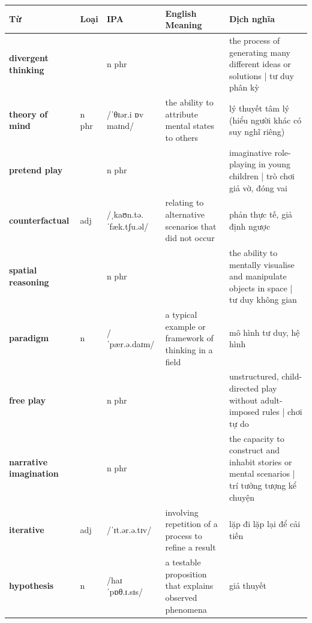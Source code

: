 \vspace{0.8em}
\begin{center}
\renewcommand{\arraystretch}{1.65}
\begin{tabularx}{\textwidth}{|V{0.22\textwidth}|C{0.07\textwidth}|I{0.20\textwidth}|Y|V{0.18\textwidth}|}
\hline
{}
\textbf{Từ} & \textbf{Loại} & \textbf{IPA} & \textbf{English Meaning} & \textbf{Dịch nghĩa} \\
\hline
\textbf{divergent thinking} & & n phr & & the process of generating many different ideas or solutions | tư duy phân kỳ \\ \hline
\textbf{theory of mind} & n phr & /ˈθɪər.i ɒv maɪnd/ & the ability to attribute mental states to others & lý thuyết tâm lý (hiểu người khác có suy nghĩ riêng) \\ \hline
\textbf{pretend play} & & n phr & & imaginative role-playing in young children | trò chơi giả vờ, đóng vai \\ \hline
\textbf{counterfactual} & adj & /ˌkaʊn.tə.ˈfæk.tʃu.əl/ & relating to alternative scenarios that did not occur & phản thực tế, giả định ngược \\ \hline
\textbf{spatial reasoning} & & n phr & & the ability to mentally visualise and manipulate objects in space | tư duy không gian \\ \hline
\textbf{paradigm} & n & /ˈpær.ə.daɪm/ & a typical example or framework of thinking in a field & mô hình tư duy, hệ hình \\ \hline
\textbf{free play} & & n phr & & unstructured, child-directed play without adult-imposed rules | chơi tự do \\ \hline
\textbf{narrative imagination} & & n phr & & the capacity to construct and inhabit stories or mental scenarios | trí tưởng tượng kể chuyện \\ \hline
\textbf{iterative} & adj & /ˈɪt.ər.ə.tɪv/ & involving repetition of a process to refine a result & lặp đi lặp lại để cải tiến \\ \hline
\textbf{hypothesis} & n & /haɪˈpɒθ.ɪ.sɪs/ & a testable proposition that explains observed phenomena & giả thuyết \\ \hline
\end{tabularx}
\end{center}

\newpage

